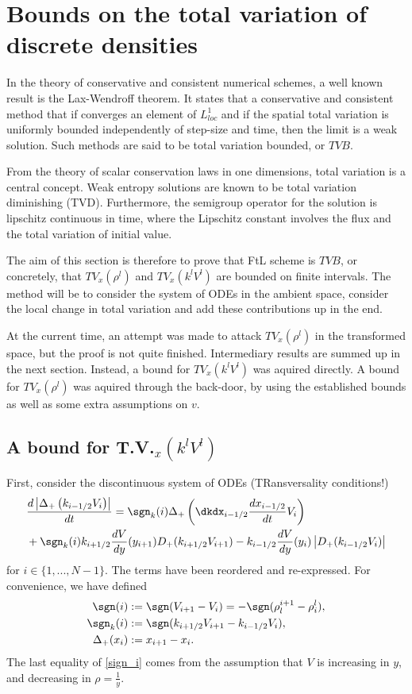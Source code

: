 \section{Bounds on the total variation of discrete densities}

In the theory of conservative and consistent numerical schemes, a well known result is the Lax-Wendroff theorem. It states that a conservative and consistent method that if converges an element of $L^1_{loc}$ and if the spatial total variation is uniformly bounded independently of step-size and time, then the limit is a weak solution. Such methods are said to be total variation bounded, or $TVB$. 

From the theory of scalar conservation laws in one dimensions, total variation is a central concept. Weak entropy solutions are known to be total variation diminishing (TVD). Furthermore, the semigroup operator for the solution is lipschitz continuous in time, where the Lipschitz constant involves the flux and the total variation of initial value.

The aim of this section is therefore to prove that FtL scheme is $TVB$, or concretely, that $TV_x(\rho^l)$ and $TV_x(k^l V^l)$ are bounded on finite intervals. The method will be to consider the system of ODEs in the ambient space, consider the local change in total variation and add these contributions up in the end. 

At the current time, an attempt was made to attack $TV_x(\rho^l)$ in the transformed space, but the proof is not quite finished. Intermediary results are summed up in the next section. Instead, a bound for $TV_x(k^l V^l)$ was aquired directly. A bound for $TV_x(\rho^l)$ was aquired through the back-door, by using the established bounds as well as some extra assumptions on $v$. 


\subsection{A bound for T.V.$_x(k^lV^l)$}
First, consider the discontinuous system of ODEs  (TRansversality conditions!)
\begin{align} \label{local_TV_kv_deriv}
    &\frac{d \left| \Delta_+\left(k_{i-1/2}V_{i}\right) \right|}{dt}=
     \sgn_k(i) \Delta_+\left(\dkdx_{i-1/2} \frac{dx_{i-1/2}}{dt} V_{i}\right) \nonumber\\
     &+ \sgn_k(i) k_{i+1/2} \frac{dV}{dy}(y_{i+1}) D_+(k_{i+1/2}V_{i+1}) - k_{i-1/2} \frac{dV}{dy}(y_i) \left|D_+(k_{i-1/2}V_{i})\right| \label{Diff_kV_1}
\end{align}
for $i \in \{1,...,N-1\}$. The terms have been reordered and re-expressed. For convenience, we have defined 
\begin{align}
	\sgn(i) &:= \sgn(V_{i+1} - V_i) = - \sgn(\rho_l^{i+1} - \rho^l_i), \label{sign_i}\\
	\sgn_k(i) &:= \sgn(k_{i+1/2}V_{i+1} - k_{i-1/2}V_i), \\
	\Delta_+(x_i) &:= x_{i+1} - x_{i}. 
\end{align}
The last equality of \eqref{sign_i} comes from the assumption that $V$ is increasing in $y$, and decreasing in $\rho = \frac{1}{y}$.  

